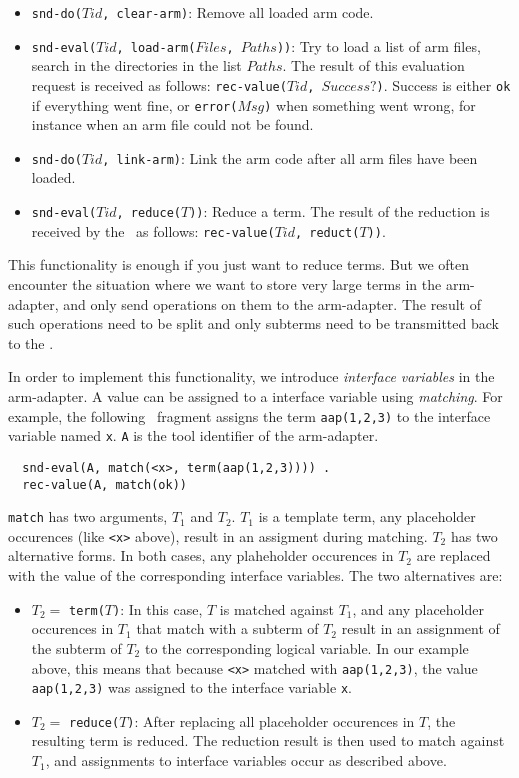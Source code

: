 \begin{itemize}
\item {\tt snd-do($Tid$, clear-arm)}: Remove all loaded arm code.
\item {\tt snd-eval($Tid$, load-arm($Files$, $Paths$))}: Try to load a list
      of arm files, search in the directories in the list $Paths$.
      The result of this evaluation request is received as follows:
      {\tt rec-value($Tid$, $Success?$)}. Success is either {\tt ok} if
      everything went fine, or {\tt error($Msg$)} when something went wrong,
      for instance when an arm file could not be found.
\item {\tt snd-do($Tid$, link-arm)}: Link the arm code after all arm files
      have been loaded.
\item {\tt snd-eval($Tid$, reduce($T$))}: Reduce a term. The result
      of the reduction is received by the \TB\ as follows:
      {\tt rec-value($Tid$, reduct($T$))}.
\end{itemize}

This functionality is enough if you just want to reduce terms.
But we often encounter the situation where we want to store very
large terms in the arm-adapter, and only send operations on them
to the arm-adapter. The result of such operations need to be
split and only subterms need to be transmitted back to the \TB.

In order to implement this functionality, we introduce \emph{interface
variables} in the arm-adapter. A value can be assigned to a interface
variable using \emph{matching}. For example, the following
\TB\ fragment assigns the term {\tt aap(1,2,3)} to the interface variable
named {\tt x}. {\tt A} is the tool identifier of the arm-adapter.
\begin{verbatim}
  snd-eval(A, match(<x>, term(aap(1,2,3)))) .
  rec-value(A, match(ok))
\end{verbatim}

{\tt match} has two arguments, $T_1$ and $T_2$. 
$T_1$ is a template term,
any placeholder occurences (like {\tt <x>} above), result in
an assigment during matching.
$T_2$ has two alternative forms. In both cases, any
plaheholder occurences in $T_2$ are replaced with the value
of the corresponding interface variables.
The two alternatives are:
\begin{itemize}
\item $T_2 =$ {\tt term($T$)}: In this case, $T$ is matched against
      $T_1$, and any placeholder occurences in $T_1$ that match with
      a subterm of $T_2$ result in an assignment of the subterm of $T_2$
      to the corresponding logical variable. 
      In our example above, this means that because {\tt <x>} matched 
      with {\tt aap(1,2,3)}, the value {\tt aap(1,2,3)} was assigned to 
      the interface variable {\tt x}.
\item $T_2 =$ {\tt reduce($T$)}: After replacing all placeholder occurences
      in {\tt $T$}, the resulting term is reduced. The reduction result is
      then used to match against $T_1$, and assignments to interface variables
      occur as described above.
\end{itemize}

